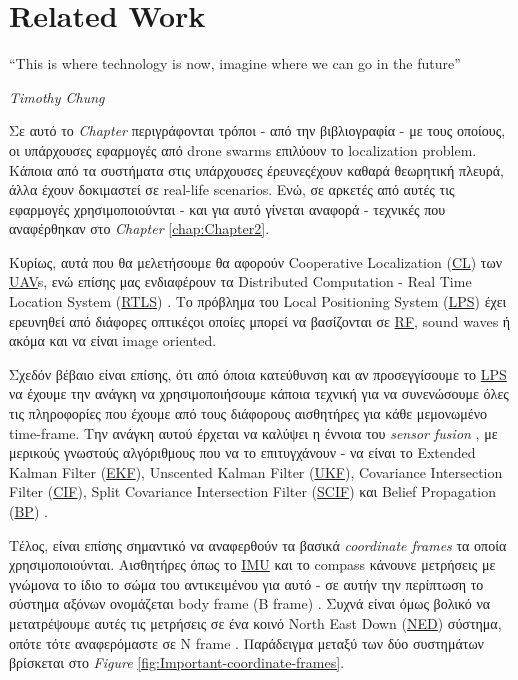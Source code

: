 \chapter{Related Work} \label{chap:Chapter3}       
\epigraph{``This is where technology is now, imagine where we can go in the future” }{\textit{Timothy Chung}}

Σε αυτό το \emph{Chapter} περιγράφονται τρόποι - από την βιβλιογραφία - με τους οποί\-ους, οι υπάρχουσες εφαρμογές 
από drone swarms επιλύουν το localization pro\-blem. Κάποια από τα συστήματα στις υπάρχουσες έρευνες\udot έχουν καθαρά
θεωρητική πλευρά, άλλα έχουν δοκιμαστεί σε real-life scenarios.
Ενώ, σε αρκετές από αυτές τις εφαρμογές χρησιμοποιούνται - 
και για αυτό γίνεται αναφορά - τεχνικές που αναφέ\-ρθηκαν στο \emph{Chapter} \ref{chap:Chapter2}.

Κυρίως, αυτά που θα μελετήσουμε θα αφορούν Cooperative Localization (\hyperref[abbr:CL]{CL}) των \hyperref[abbr:UAV]{UAV}s, ενώ επίσης
μας ενδιαφέρουν τα Distributed Computation - Real Time Location System (\hyperref[abbr:RTLS]{RTLS}) \cite{rtls}. Το πρόβλημα του Local Positioning System 
(\hyperref[abbr:LPS]{LPS}) \cite{lps} έχει ερευνηθεί από διάφορες οπτικές\udot οι οποίες μπορεί να βασίζονται σε 
\hyperref[abbr:RF]{RF}, sound waves ή ακόμα και να είναι image oriented.

Σχεδόν βέβαιο είναι επίσης, ότι από όποια κατεύθυνση και αν προσεγγίσουμε το \hyperref[abbr:LPS]{LPS} να έχουμε την ανάγκη να 
χρησιμοποιήσουμε κάποια τεχνική για να συνενώσουμε όλες τις πληροφορίες που έχουμε από τους διάφορους αισθητήρες για κάθε μεμονωμένο 
time-frame. Την ανάγκη αυτού έρχεται να καλύψει η έννοια του \emph{sensor fusion} \cite{sensor-fusion}, με μερικούς γνωστούς 
αλγόριθμους που να το επιτυγχάνουν - να είναι το  
Extended Kalman Filter (\hyperref[abbr:EKF]{EKF}), Unscented Kalman Filter (\hyperref[abbr:UKF]{UKF}), Covariance Intersection  
Filter (\hyperref[abbr:CIF]{CIF}),  Split  Covariance  Intersection  Filter (\hyperref[abbr:SCIF]{SCIF}) και  Belief  Propagation 
(\hyperref[abbr:BP]{BP}) \cite{fusion-filters}. 

Τέλος, είναι επίσης σημαντικό να αναφερθούν τα βασικά \emph{coordinate frames} τα οποία χρησιμοποιούνται. 
Αισθητήρες όπως το \hyperref[abbr:IMU]{IMU} και το compass κάνουνε μετρήσεις με γνώμονα το ίδιο το σώμα 
του αντικειμένου για αυτό - σε αυτήν την περίπτωση το σύστημα αξόνων ονομάζεται body frame (B frame) \cite{uwb-imu-gps1}.
Συχνά είναι όμως βολικό να μετατρέψουμε αυτές τις μετρήσεις σε ένα κοινό North East Down (\hyperref[abbr:NED]{NED}) 
σύστημα, οπότε τότε αναφερόμαστε σε N frame \cite{uwb-imu-gps1} \cite{body-frames}. Παράδειγμα μεταξύ των δύο 
συστημάτων βρίσκεται στο \emph{Figure} \ref{fig:Important-coordinate-frames}.


